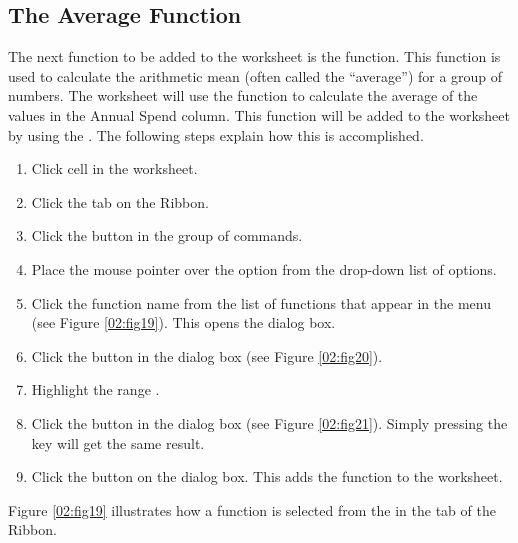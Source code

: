 \subsection{The Average Function}

The next function to be added to the  worksheet is the  function. This function is used to calculate the arithmetic mean (often called the ``average'') for a group of numbers. The  worksheet will use the function to calculate the average of the values in the Annual Spend column. This function will be added to the worksheet by using the . The following steps explain how this is accomplished.

\begin{enumerate}
	\item Click cell  in the  worksheet.
	\item Click the  tab on the Ribbon.
	\item Click the  button in the  group of commands.
	\item Place the mouse pointer over the  option from the drop-down list of options.
	\item Click the  function name from the list of functions that appear in the menu (see Figure \ref{02:fig19}). This opens the  dialog box.
	\item Click the  button in the  dialog box (see Figure \ref{02:fig20}).
	\item Highlight the range .
	\item Click the  button in the  dialog box (see Figure \ref{02:fig21}). Simply pressing the  key will get the same result.
	\item Click the  button on the  dialog box. This adds the  function to the worksheet.
\end{enumerate}

Figure \ref{02:fig19} illustrates how a function is selected from the  in the  tab of the Ribbon.

